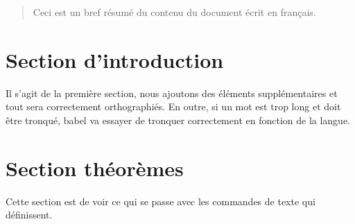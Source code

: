 \documentclass[french]{report}
\begin{document}
\tableofcontents

\vspace{2cm} %

\begin{abstract}
Ceci est un bref résumé du contenu du document écrit en français.
\end{abstract}

\section{Section d'introduction}
Il s'agit de la première section, nous ajoutons des éléments supplémentaires et tout sera correctement orthographiés. En outre, si un mot est trop long et doit être tronqué, babel va essayer de tronquer correctement en fonction de la langue.

\section{Section théorèmes}
Cette section est de voir ce qui se passe avec les commandes de texte qui définissent.
\end{document}
